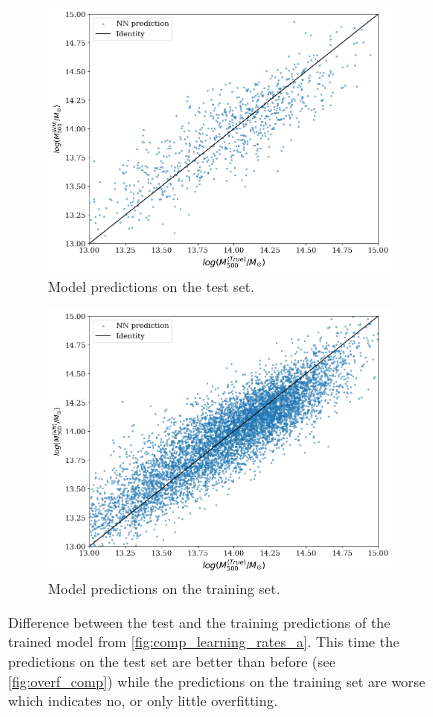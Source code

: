 \begin{figure}[H]
\centering
\begin{subfigure}{.46\textwidth}
  \centering
  \includegraphics[width=\linewidth]{images/Chapter4/Basic CNN/best_perf_test.png}
  \caption{Model predictions on the test set.}
\end{subfigure}%
\hspace{.6em}
\begin{subfigure}{.46\textwidth}
  \centering
  \includegraphics[width=\linewidth]{images/Chapter4/Basic CNN/best_perf_train.png}
  \caption{Model predictions on the training set.}
\end{subfigure}
\caption{Difference between the test and the training predictions of the trained model from \autoref{fig:comp_learning_rates_a}. This time the predictions on the test set are better than before (see \autoref{fig:overf_comp}) while the predictions on the training set are worse which indicates no, or only little overfitting.} 
\label{fig:short_training_comp}
\end{figure}

